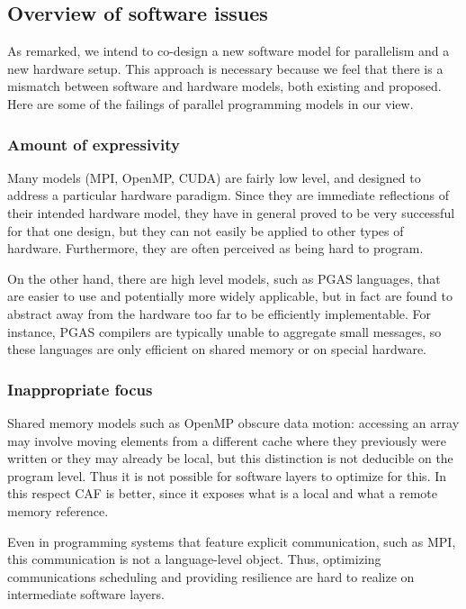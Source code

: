 \subsection{Overview of software issues}

As remarked, we intend to co-design a new software model for parallelism
and a new hardware setup. This approach is necessary because we feel that there
is a mismatch between software and hardware models, both existing and proposed.
%
Here are some of the failings of parallel programming models in our view.

\subsubsection{Amount of expressivity}

Many models (MPI, OpenMP, CUDA) are fairly low level, and
  designed to address a particular hardware paradigm. Since they are
  immediate reflections of their intended hardware model, they have in
  general proved to be very successful for that one design, but they
  can not easily be applied to other types of hardware. Furthermore,
  they are often perceived as being hard to program.

On the other hand, there are high level models, such as
  \ac{PGAS} languages, that are easier to use and potentially
  more widely applicable, but in
  fact are found to abstract away from the hardware too far to be
  efficiently implementable. For instance, \ac{PGAS} compilers are
  typically unable to aggregate small messages, so these languages are
  only efficient on shared memory or on special hardware.

\subsubsection{Inappropriate focus}

Shared memory models such as OpenMP obscure data motion:
  accessing an array may involve moving elements from a different
  cache where they previously were written or they may already be
  local, but this distinction is not deducible on the program level.
  Thus it is not possible for software layers to optimize for this.
  In this respect \ac{CAF} is better, since it exposes what is a local
  and what a remote memory reference.

Even in programming systems that feature explicit communication, such as
\ac{MPI}, this communication is not a language-level object. Thus,
optimizing communications scheduling and providing resilience are hard
to realize on intermediate software layers.

